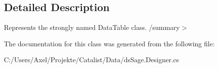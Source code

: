 \subsection{Detailed Description}
Represents the strongly named Data\+Table class. /summary$>$ 

The documentation for this class was generated from the following file\+:\begin{DoxyCompactItemize}
\item 
C\+:/\+Users/\+Axel/\+Projekte/\+Catalist/\+Data/ds\+Sage.\+Designer.\+cs\end{DoxyCompactItemize}
